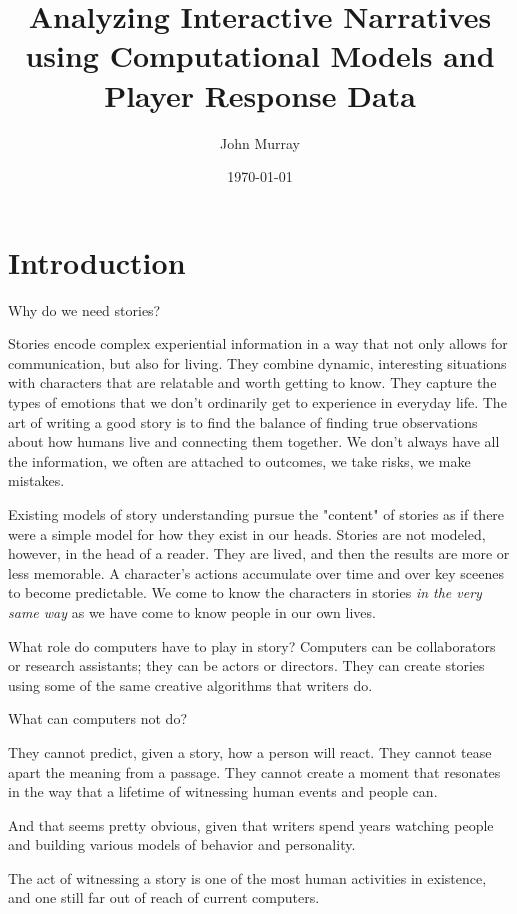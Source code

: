 \documentclass[11pt]{article}
\author{John Murray}
\date{\today}
\title{Analyzing Interactive Narratives using Computational Models and Player Response Data}
\begin{document}
\maketitle
\section{Introduction}
\label{sec:org2fabd7a}
Why do we need stories?

\cite{Mateas2002-dw}

\cite{Elson2012-pi}


Stories encode complex experiential information in a way that not only
allows for communication, but also for living. They combine dynamic,
interesting situations with characters that are relatable and worth
getting to know. They capture the types of emotions that we don't
ordinarily get to experience in everyday life. The art of writing a
good story is to find the balance of finding true observations about
how humans live and connecting them together. We don't always have all
the information, we often are attached to outcomes, we take risks, we
make mistakes.

Existing models of story understanding pursue the "content" of stories
as if there were a simple model for how they exist in our
heads. Stories are not modeled, however, in the head of a reader. They
are lived, and then the results are more or less memorable. A
character's actions accumulate over time and over key sceenes to
become predictable. We come to know the characters in stories \emph{in the
very same way} as we have come to know people in our own lives.

What role do computers have to play in story? Computers can be
collaborators or research assistants; they can be actors or
directors. They can create stories using some of the same creative
algorithms that writers do.

What can computers not do?

They cannot predict, given a story, how a person will react. They
cannot tease apart the meaning from a passage. They cannot create a
moment that resonates in the way that a lifetime of witnessing human
events and people can.

And that seems pretty obvious, given that writers spend years watching
people and building various models of behavior and personality.

The act of witnessing a story is one of the most human activities in
existence, and one still far out of reach of current computers.
\end{document}
